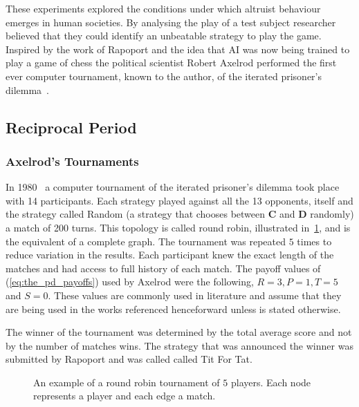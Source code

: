 \documentclass{article}
\begin{document}
These experiments explored the conditions under which altruist behaviour emerges
in human societies. By analysing the play of a test subject researcher believed
that they could identify an unbeatable strategy to play the game. Inspired by 
the work of Rapoport and the idea that AI was now being trained to play a 
game of chess the political scientist Robert Axelrod performed
the first ever computer tournament, known to the author, of the iterated 
prisoner's dilemma~\cite{Axelrod1981, axelrod2012}.

\subsection{Reciprocal Period}\label{subsection:reciprocal}

\subsubsection{Axelrod's Tournaments}\label{subsection:axelrods_tournament}

In 1980~\cite{axelrod1980a} a computer tournament of the iterated prisoner's
dilemma took place with 14 participants. Each strategy played against all the
13 opponents, itself and the strategy called Random (a strategy that chooses
between \textbf{C} and \textbf{D} randomly) a match of 200 turns. This topology
is called round robin, illustrated in~\ref{fig:round_robin_topology}, and is the
equivalent of a complete graph. The tournament was repeated \(5\) times to
reduce variation in the results. Each participant knew the exact length of the
matches and had access to full history of each match. The payoff values of
(\ref{eq:the_pd_payoffs}) used by Axelrod were the following, \(R=3, P=1, T=5\)
and \(S=0\). These values are commonly used in literature and assume that they are
being used in the works referenced henceforward unless is stated otherwise.

The winner of the tournament was determined by the total average score and not by
the number of matches wins. The strategy that was announced the winner was
submitted by Rapoport and was called called Tit For Tat.

\begin{figure}[!hbtp]
    \centering
    
    \caption{An example of a round robin tournament of \(5\) players. Each 
    node represents a player and each edge a match.}
    \label{fig:round_robin_topology}
\end{figure}
\end{document}
